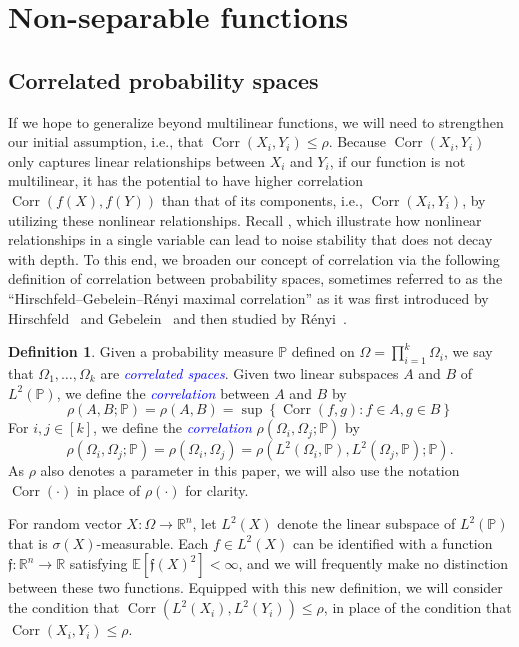 \documentclass[12pt,letterpaper]{amsart}
\newcommand{\dfn}[1]{\textcolor{blue}{\emph{#1}}}
\def\E{\mathbb{E}}
\def\P{\mathbb{P}}
\def\R{\mathbb{R}}
\def\Corr{\operatorname{Corr}}
\newcommand{\mf}[1]{\mathfrak{#1}}
\newcommand{\set}[1]{\left\{#1\right\}}
\newcommand{\1}[1]{1_{\left\{#1\right\}}}
\theoremstyle{definition}
\newtheorem{definition}[theorem]{Definition}
\theoremstyle{remark}
\begin{document}
\section{Non-separable functions}\label{sec:non_separable}
\subsection{Correlated probability spaces}\label{subsec:correlated_spaces}
If we hope to generalize  beyond multilinear functions, we will need to strengthen our initial assumption, i.e., that $\Corr(X_i,Y_i)\leq\rho$.
Because $\Corr(X_i,Y_i)$ only captures linear relationships between $X_i$ and $Y_i$, if our function is not multilinear, it has the potential to have higher correlation $\Corr(f(X),f(Y))$ than that of its components, i.e., $\Corr(X_i,Y_i)$, by utilizing these nonlinear relationships.
Recall , which illustrate how nonlinear relationships in a single variable can lead to noise stability that does not decay with depth.
To this end, we broaden our concept of correlation via the following definition of correlation between probability spaces, sometimes referred to as the ``Hirschfeld--Gebelein--R\'enyi maximal correlation'' as it was first introduced by Hirschfeld~\cite{hirschfeld1935connection} and Gebelein~\cite{Gebelein:41} and then studied by R\'enyi~\cite{Renyi:59}.
\begin{definition}
    Given a probability measure $\P$ defined on $\Omega=\prod_{i=1}^k \Omega_i$, we say that $\Omega_1,\dots,\Omega_k$ are \dfn{correlated spaces}.
    Given two linear subspaces $A$ and $B$ of $L^2(\P)$, we define the \dfn{correlation} between $A$ and $B$ by
    \[ \rho(A,B;\P)=\rho(A,B)=\sup\set{\Corr(f,g):f\in A, g\in B} \]
    For $i,j\in[k]$, we define the \dfn{correlation} $\rho(\Omega_i,\Omega_j;\P)$ by
    \[ \rho(\Omega_i,\Omega_j;\P)=\rho(\Omega_i,\Omega_j)=\rho(L^2(\Omega_i,\P),L^2(\Omega_j,\P);\P). \] 
    As $\rho$ also denotes a parameter in this paper, we will also use the notation $\Corr(\cdot)$ in place of $\rho(\cdot)$ for clarity. 
\end{definition}
For random vector $X:\Omega\to\R^n$, let $L^2(X)$ denote the linear subspace of $L^2(\P)$ that is $\sigma(X)$-measurable.
Each $f\in L^2(X)$ can be identified with a function $\mf f:\R^n\to\R$ satisfying $\E[\mf f(X)^2]<\infty$, and we will frequently make no distinction between these two functions.
Equipped with this new definition, we will consider the condition that $\Corr(L^2(X_i),L^2(Y_i))\leq\rho$, in place of the condition that $\Corr(X_i,Y_i)\leq\rho$.
\end{document}
